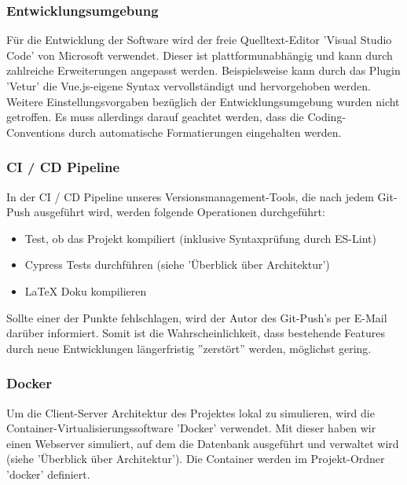\documentclass[twoside]{report}
\begin{document}
\subsubsection{Entwicklungsumgebung}
Für die Entwicklung der Software wird der freie Quelltext-Editor 'Visual Studio Code'
von Microsoft verwendet. Dieser ist plattformunabhängig und kann durch zahlreiche Erweiterungen
angepasst werden. Beispielsweise kann durch das Plugin 'Vetur' die Vue.js-eigene Syntax
vervollständigt und hervorgehoben werden.
\\Weitere Einstellungsvorgaben bezüglich der Entwicklungsumgebung wurden nicht getroffen.
Es muss allerdings darauf geachtet werden, dass die Coding-Conventions durch automatische
Formatierungen eingehalten werden.

\subsubsection{CI / CD Pipeline}
In der CI / CD Pipeline unseres Versionsmanagement-Tools, die nach jedem Git-Push
ausgeführt wird, werden folgende Operationen durchgeführt:
\begin{itemize}
  \item Test, ob das Projekt kompiliert (inklusive Syntaxprüfung durch ES-Lint)
  \item Cypress Tests durchführen (siehe 'Überblick über Architektur')
  \item LaTeX Doku kompilieren
\end{itemize}

Sollte einer der Punkte fehlschlagen, wird der Autor des Git-Push's per E-Mail
darüber informiert. Somit ist die Wahrscheinlichkeit, dass bestehende Features durch
neue Entwicklungen längerfristig ''zerstört'' werden, möglichst gering.

\subsubsection{Docker}
Um die Client-Server Architektur des Projektes lokal zu simulieren, wird die
Container-Virtualisierungssoftware 'Docker' verwendet.
Mit dieser haben wir einen Webserver simuliert, auf dem die Datenbank ausgeführt
und verwaltet wird (siehe 'Überblick über Architektur'). Die Container werden
im Projekt-Ordner 'docker' definiert.
\end{document}
